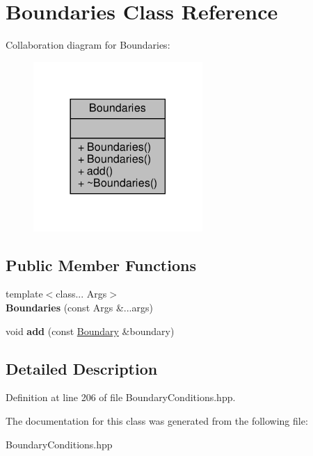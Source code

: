 \hypertarget{classBoundaries}{}\section{Boundaries Class Reference}
\label{classBoundaries}


Collaboration diagram for Boundaries\+:\nopagebreak
\begin{figure}[H]
\begin{center}
\leavevmode
\includegraphics[width=182pt]{classBoundaries__coll__graph}
\end{center}
\end{figure}
\subsection*{Public Member Functions}
\begin{DoxyCompactItemize}
\item 
\mbox{\label{classBoundaries_a3b650d6c7656b9fb6a3e87b0176a21e7}} 
{\footnotesize template$<$class... Args$>$ }\\{\bfseries Boundaries} (const Args \&...args)
\item 
\mbox{\label{classBoundaries_ab1cee1294351a196cf30b2fea3d62c0e}} 
void {\bfseries add} (const \hyperlink{classBoundary}{Boundary} \&boundary)
\end{DoxyCompactItemize}


\subsection{Detailed Description}


Definition at line 206 of file Boundary\+Conditions.\+hpp.



The documentation for this class was generated from the following file\+:\begin{DoxyCompactItemize}
\item 
Boundary\+Conditions.\+hpp\end{DoxyCompactItemize}
